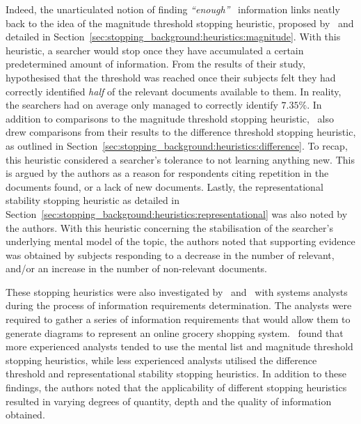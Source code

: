 Indeed, the unarticulated notion of finding \emph{``enough''}~\citep{zach2005enough_is_enough} information links neatly back to the idea of the magnitude threshold stopping heuristic, proposed by~\cite{nickles1995judgment} and detailed in Section~\ref{sec:stopping_background:heuristics:magnitude}. With this heuristic, a searcher would stop once they have accumulated a certain predetermined amount of information. From the results of their study,~\cite{dostert2009satisficing} hypothesised that the threshold was reached once their subjects felt they had correctly identified \emph{half} of the relevant documents available to them. In reality, the searchers had on average only managed to correctly identify $7.35\%$. In addition to comparisons to the magnitude threshold stopping heuristic,~\cite{dostert2009satisficing} also drew comparisons from their results to the difference threshold stopping heuristic, as outlined in Section~\ref{sec:stopping_background:heuristics:difference}. To recap, this heuristic considered a searcher's tolerance to not learning anything new. This is argued by the authors as a reason for respondents citing repetition in the documents found, or a lack of new documents. Lastly, the representational stability stopping heuristic as detailed in Section~\ref{sec:stopping_background:heuristics:representational} was also noted by the authors. With this heuristic concerning the stabilisation of the searcher's underlying mental model of the topic, the authors noted that supporting evidence was obtained by subjects responding to a decrease in the number of relevant, and/or an increase in the number of non-relevant documents.

These stopping heuristics were also investigated by~\cite{browne2004stopping_rules} and~\cite{pitts2004stopping_rules} with systems analysts during the process of information requirements determination. The analysts were required to gather a series of information requirements that would allow them to generate diagrams to represent an online grocery shopping system.~\cite{browne2004stopping_rules} found that more experienced analysts tended to use the mental list and magnitude threshold stopping heuristics, while less experienced analysts utilised the difference threshold and representational stability stopping heuristics. In addition to these findings, the authors noted that the applicability of different stopping heuristics resulted in varying degrees of quantity, depth and the quality of information obtained.

